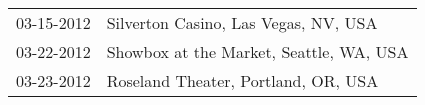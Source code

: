 \begin{supertabular}{ll}
 03-15-2012 &     Silverton Casino, Las Vegas, NV, USA \\
 03-22-2012 &  Showbox at the Market, Seattle, WA, USA \\
 03-23-2012 &      Roseland Theater, Portland, OR, USA \\
\end{supertabular}
